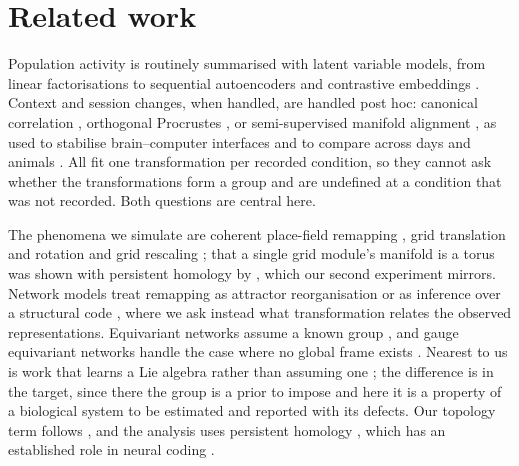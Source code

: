 \documentclass{article}
\theoremstyle{plain}
\begin{document}
\section{Related work}

Population activity is routinely summarised with latent variable models, from
linear factorisations \citep{cunningham2014dimensionality} to sequential
autoencoders \citep{pandarinath2018inferring} and contrastive embeddings
\citep{schneider2023cebra}. Context and session changes, when handled, are
handled post hoc: canonical correlation \citep{hotelling1936relations},
orthogonal Procrustes \citep{schonemann1966generalized}, or semi-supervised
manifold alignment \citep{ham2005semisupervised}, as used to stabilise
brain--computer interfaces \citep{degenhart2020stabilization} and to compare
across days and animals \citep{gallego2020longterm,safaie2023preserved}. All fit
one transformation per recorded condition, so they cannot ask whether the
transformations form a group and are undefined at a condition that was not
recorded. Both questions are central here.

The phenomena we simulate are coherent place-field remapping
\citep{muller1987effects,colgin2008understanding}, grid translation and rotation
\citep{hafting2005microstructure,fyhn2007hippocampal,stensola2012entorhinal} and
grid rescaling \citep{barry2007experience}; that a single grid module's manifold
is a torus was shown with persistent homology by \citet{gardner2022toroidal},
which our second experiment mirrors. Network models treat remapping as attractor
reorganisation \citep{burak2009accurate,low2021remapping} or as inference over a
structural code \citep{whittington2020tolman}, where we ask instead what
transformation relates the observed representations.
Equivariant networks assume a known group
\citep{cohen2016group,weiler2019general,bronstein2017geometric}, and gauge
equivariant networks handle the case where no global frame exists
\citep{cohen2019gauge,bronstein2021geometric}. Nearest to us is work that learns
a Lie algebra rather than assuming one
\citep{dehmamy2021automatic,finzi2021practical,connor2021variational,keller2021topographic};
the difference is in the target, since there the group is a prior to impose and
here it is a property of a biological system to be estimated and reported with
its defects. Our topology term follows \citet{moor2020topological}, and the
analysis uses persistent homology
\citep{edelsbrunner2002topological,carlsson2009topology,tralie2018ripser}, which
has an established role in neural coding
\citep{singh2008topological,curto2017what,chaudhuri2019intrinsic}.
\end{document}
